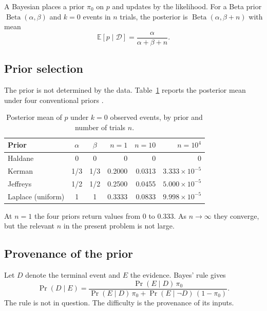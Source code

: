 \documentclass[11pt]{article}
\theoremstyle{remark}
\DeclareMathOperator{\Beta}{Beta}
\newcommand{\Ex}{\mathbb{E}}
\begin{document}
A Bayesian places a prior $\pi_0$ on $p$ and updates by the likelihood. For a Beta prior $\Beta(\alpha,\beta)$ and $k=0$ events in $n$ trials, the posterior is $\Beta(\alpha,\beta+n)$ with mean
\begin{equation}\label{eq:postmean}
\Ex[p\mid \mathcal{D}]=\frac{\alpha}{\alpha+\beta+n}.
\end{equation}

\subsection{Prior selection}

The prior is not determined by the data. Table~\ref{tab:priors} reports the posterior mean under four conventional priors \cite{jeffreys1946,laplace1814,kerman2011}.

\begin{table}[h]
\centering
\caption{Posterior mean of $p$ under $k=0$ observed events, by prior and number of trials $n$.}\label{tab:priors}
\begin{tabular}{@{}lccrrr@{}}
\toprule
Prior & $\alpha$ & $\beta$ & $n=1$ & $n=10$ & $n=10^{4}$ \\
\midrule
Haldane & 0 & 0 & 0 & 0 & 0 \\
Kerman & 1/3 & 1/3 & 0.2000 & 0.0313 & $3.333\times10^{-5}$ \\
Jeffreys & 1/2 & 1/2 & 0.2500 & 0.0455 & $5.000\times10^{-5}$ \\
Laplace (uniform) & 1 & 1 & 0.3333 & 0.0833 & $9.998\times10^{-5}$ \\
\bottomrule
\end{tabular}
\end{table}

At $n=1$ the four priors return values from $0$ to $0.333$. As $n\to\infty$ they converge, but the relevant $n$ in the present problem is not large.

\subsection{Provenance of the prior}

Let $D$ denote the terminal event and $E$ the evidence. Bayes' rule gives
\begin{equation}\label{eq:bayesrule}
\Pr(D\mid E)=\frac{\Pr(E\mid D)\,\pi_0}{\Pr(E\mid D)\,\pi_0+\Pr(E\mid \neg D)\,(1-\pi_0)}.
\end{equation}
The rule is not in question. The difficulty is the provenance of its inputs.
\end{document}
